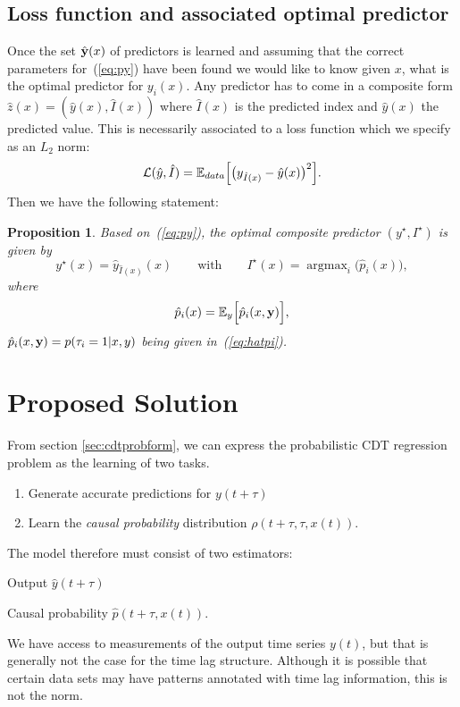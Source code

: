 \documentclass[envcountsect,runningheads]{llncs}
\theoremstyle{etoile}
\newtheorem{prop}{Proposition}[section]
\DeclareMathOperator*{\argmax}{argmax}
\begin{document}
\subsection{Loss function and associated optimal predictor}
Once the set $\hat {\bf y}(x)$ of predictors is learned and assuming that the correct parameters for~(\ref{eq:py}) have been found
we would like to know given $x$, what is the optimal predictor for $y_i(x)$. Any predictor has  to come in a composite form
$\hat z(x) = (\hat y(x),\hat I(x))$ where $\hat I(x)$ is the predicted index and $\hat y(x)$ the predicted value.
This is necessarily associated to a loss function 
which we specify as an $L_2$ norm:
\[
{\cal L}(\hat y,\hat I) = {\mathbb E}_{data}\Bigl[\bigl(y_{\hat I(x)}-\hat y(x)\bigr)^2\Bigr]. 
\]
Then we have the following statement:
\begin{prop}
Based on~(\ref{eq:py}), the optimal composite predictor $(y^\star,I^\star)$ is given by
\[
y^\star(x) = \hat y_{\hat I(x)}(x)\qquad\text{with}\qquad I^\star(x) = \argmax_{i} \bigl(\hat p_i(x)\bigr), 
\]
where
\[
\hat p_i(x) = {\mathbb E}_y\Bigl[\hat p_i(x,{\bf y})\Bigr],
\]
$\hat p_i(x,{\bf y}) = p(\tau_i=1\vert x,y)$ being given in~(\ref{eq:hatpi}). 
\end{prop}







\section{Proposed Solution}\label{sec:model}

From section \ref{sec:cdtprobform}, we can express the probabilistic CDT regression 
problem as the learning of two tasks.

\begin{enumerate}
    \item Generate accurate predictions for $y(t + \tau)$
    \item Learn the \emph{causal probability} distribution $\rho(t + \tau, \tau, x(t))$.
\end{enumerate}

The model therefore must consist of two estimators:
\begin{inparaenum}[1.]
      \item Output $\hat{y}(t + \tau)$
      \item Causal probability $\hat{p}(t + \tau, x(t))$.
\end{inparaenum} 
We have access to measurements of the output time series $y(t)$, but that is 
generally not the case for the time lag structure. Although it is possible 
that certain data sets may have patterns annotated with time lag information, 
this is not the norm.
\end{document}
